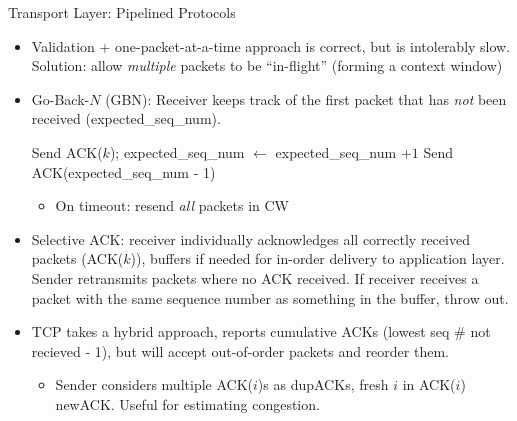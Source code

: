 \documentclass{beamer}
\begin{document}
\begin{frame}[t]{Transport Layer: Pipelined Protocols}
    \begin{itemize}
        \item Validation + one-packet-at-a-time approach is correct, but is intolerably slow. \alert{Solution:} allow \textit{multiple} packets to be ``in-flight'' (forming a \alert{context window})
        \item \pause \alert{Go-Back-$N$} (GBN): Receiver keeps track of the first packet that has \textit{not} been received (expected\_seq\_num). 
        \begin{algorithmic}[1]
                \State Send ACK($k$); expected\_seq\_num $\gets$ expected\_seq\_num $ + 1$
            \Else
                \State Send ACK(expected\_seq\_num - 1) 
            \EndIf
        \EndProcedure
        \end{algorithmic}
        \begin{itemize}
            \item On timeout: resend \textit{all} packets in CW
        \end{itemize}
        \item \pause \alert{Selective ACK}: receiver individually acknowledges all correctly received packets (ACK($k$)), buffers if needed for in-order delivery to application layer. Sender retransmits packets where no ACK received. If receiver receives a packet with the same sequence number as something in the buffer, throw out.
        \item \pause TCP takes a \alert{hybrid approach}, reports cumulative ACKs (lowest seq \# not recieved - 1), but will accept out-of-order packets and reorder them.
        \begin{itemize}
            \item \pause Sender considers multiple ACK($i$)s as \alert{dupACK}s, fresh $i$ in ACK($i$) \alert{newACK}. Useful for estimating congestion.
        \end{itemize}
    \end{itemize}
\end{frame}
\end{document}
